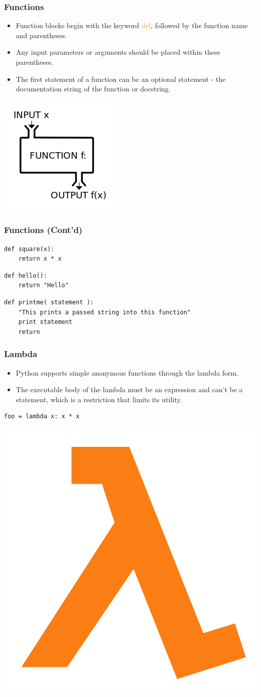 \documentclass{../py-lecture}
\begin{document}
\begin{frame}
	\frametitle{Functions}
  \begin{itemize}
    \item Function blocks begin with the keyword \textcolor{Orange}{def},
    followed by the function name and parentheses.
    \item Any input parameters or arguments should be placed
    within these parentheses.
    \item The first statement of a function can be an optional statement -
    the documentation string of the function or docstring.
  \end{itemize}
	\centering \includegraphics[width=.4\textwidth]{img/functions.jpg}
\end{frame}

\begin{frame}[fragile]
	\frametitle{Functions (Cont'd)}
  \begin{verbatim}
def square(x):
    return x * x
  \end{verbatim}
  \begin{verbatim}
def hello():
    return "Hello"
  \end{verbatim}
  \begin{verbatim}
def printme( statement ):
    "This prints a passed string into this function"
    print statement
    return
  \end{verbatim}
\end{frame}

\begin{frame}[fragile]
	\frametitle{Lambda}
  \begin{itemize}
    \item Python supports simple anonymous functions through the lambda form.
    \item The executable body of the lambda must be an expression
    and can't be a statement, which is a restriction that limits its utility.
  \end{itemize}
  \begin{verbatim}
foo = lambda x: x * x
  \end{verbatim}
	\centering \includegraphics[width=.3\textwidth]{img/lambda.png}
\end{frame}
\end{document}

